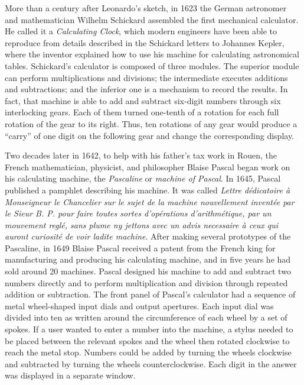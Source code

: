 {{{More than a century after Leonardo's sketch, in 1623 the German astronomer and mathematician Wilhelm Schickard assembled the first mechanical calculator. He called it a \textit{Calculating Clock}, which modern engineers have been able to reproduce from details described in the Schickard letters to Johannes Kepler, where the inventor explained how to use his machine for calculating astronomical tables. Schickard's calculator is composed of three modules. The superior module can perform multiplications and divisions; the intermediate executes additions and subtractions; and the inferior one is a mechanism to record the results. In fact, that machine is able to add and subtract six-digit numbers through six interlocking gears. Each of them turned one-tenth of a rotation for each full rotation of the gear to its right. Thus, ten rotations of any gear would produce a ``carry'' of one digit on the following gear and change the corresponding display.

Two decades later in 1642, to help with his father's tax work in Rouen, the French mathematician, physicist, and philosopher Blaise Pascal began work on his calculating machine, the \textit{Pascaline} or \textit{machine of Pascal}. In 1645, Pascal published a pamphlet describing his machine. It was called \textit{Lettre d\'{e}dicatoire \`{a} Monseigneur le Chancelier sur le sujet de la machine nouvellement invent\'{e}e par le\vadjust{\vspace*{10pt}\pagebreak} Sieur B. P. pour} \textit{faire toutes sortes d'op\'{e}rations d'arithm\'{e}tique, par un mouvement regl\'{e}, sans plume ny jettons avec un advis necessaire \`{a} ceux qui auront curiosit\'{e} de voir ladite machine}. After making several prototypes of the Pascaline, in 1649 Blaise Pascal received a patent from the French king for manufacturing and producing his calculating machine, and in five years he had sold around 20 machines. Pascal designed his machine to add and subtract two numbers directly and to perform multiplication and division through repeated addition or subtraction. The front panel of Pascal's calculator had a sequence of metal wheel-shaped input dials and output apertures. Each input dial was divided into ten as written around the circumference of each wheel by a set of spokes. If a user wanted to enter a number into the machine, a stylus needed to be placed between the relevant spokes and the wheel then rotated clockwise to reach the metal stop. Numbers could be added by turning the wheels clockwise and subtracted by turning the wheels counterclockwise. Each digit in the answer was displayed in a separate window.

}}}
